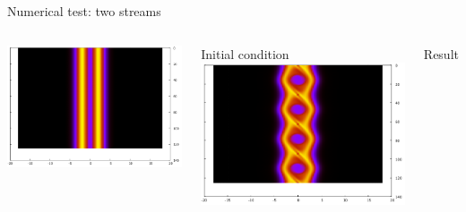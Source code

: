 \documentclass{beamer}
\begin{document}
  \begin{frame}{Numerical test: two streams}
		\begin{columns}[c]
      	\centering
        \includegraphics[width=1.2\textwidth]{img/finit_2beams.png}
        
        Initial condition
      	\centering
        \includegraphics[width=1.2\textwidth]{img/fvp_2beams.png}
        
        Result
    \end{columns}
  \end{frame}
\end{document}
